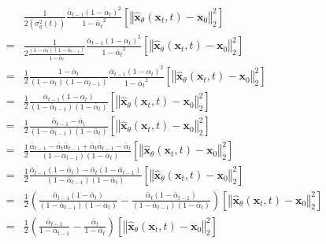 \begin{align}
    &\frac{1}{2(\sigma_{q}^{2}(t))}
    \frac{\bar{\alpha}_{t-1}{(1-\alpha_{t})}^{2}}{{ 1-\bar{\alpha}_{t}}^{2}}\left[ {\left\Vert
    \hat{\bm{x}}_{\theta}(\bm{x}_{t}, t)-\bm{x}_{0}
    \right\Vert}_{2}^{2}\right]
    \\ = & \frac{1}{2\frac{(1-\alpha_{t})(1-\bar{\alpha}_{t-1})}{1-\bar{\alpha}_{t}}}
    \frac{\bar{\alpha}_{t-1}{(1-\alpha_{t})}^{2}}{{ 1-\bar{\alpha}_{t}}^{2}}\left[ {\left\Vert
    \hat{\bm{x}}_{\theta}(\bm{x}_{t}, t)-\bm{x}_{0}
    \right\Vert}_{2}^{2}\right]
    \\ = & \frac{1}{2}\frac{1-\bar{\alpha}_{t}}{(1-\alpha_{t})(1-\bar{\alpha}_{t-1})}
    \frac{\bar{\alpha}_{t-1}{(1-\alpha_{t})}^{2}}{{ 1-\bar{\alpha}_{t}}^{2}}\left[ {\left\Vert
    \hat{\bm{x}}_{\theta}(\bm{x}_{t}, t)-\bm{x}_{0}
    \right\Vert}_{2}^{2}\right]
    \\ = & \frac{1}{2}
    \frac{\bar{\alpha}_{t-1}(1-\alpha_{t})}{(1-\bar{\alpha}_{t-1})(1-\bar{\alpha}_{t})}
    \left[ {\left\Vert
    \hat{\bm{x}}_{\theta}(\bm{x}_{t}, t)-\bm{x}_{0}
    \right\Vert}_{2}^{2}\right]
    \\ = & \frac{1}{2}
    \frac{\bar{\alpha}_{t-1}-\bar{\alpha}_{t}}{(1-\bar{\alpha}_{t-1})(1-\bar{\alpha}_{t})}
    \left[ {\left\Vert
    \hat{\bm{x}}_{\theta}(\bm{x}_{t}, t)-\bm{x}_{0}
    \right\Vert}_{2}^{2}\right]
    \\ = & \frac{1}{2}
    \frac{\bar{\alpha}_{t-1}
    -\bar{\alpha}_{t}\bar{\alpha}_{t-1}+\bar{\alpha}_{t}\bar{\alpha}_{t-1}
    -\bar{\alpha}_{t}}
    {(1-\bar{\alpha}_{t-1})(1-\bar{\alpha}_{t})}
    \left[ {\left\Vert
    \hat{\bm{x}}_{\theta}(\bm{x}_{t}, t)-\bm{x}_{0}
    \right\Vert}_{2}^{2}\right]
    \\ = & \frac{1}{2}
    \frac{\bar{\alpha}_{t-1}(1-\bar{\alpha}_{t})-\bar{\alpha}_{t}(1-\bar{\alpha}_{t-1})}
    {(1-\bar{\alpha}_{t-1})(1-\bar{\alpha}_{t})}
    \left[ {\left\Vert
    \hat{\bm{x}}_{\theta}(\bm{x}_{t}, t)-\bm{x}_{0}
    \right\Vert}_{2}^{2}\right]
    \\ = & \frac{1}{2}\left(
        \frac{\bar{\alpha}_{t-1}(1-\bar{\alpha}_{t})}{(1-\bar{\alpha}_{t-1})(1-\bar{\alpha}_{t})}
        -\frac{\bar{\alpha}_{t}(1-\bar{\alpha}_{t-1})}{(1-\bar{\alpha}_{t-1})(1-\bar{\alpha}_{t})}
    \right)
    \left[ {\left\Vert
    \hat{\bm{x}}_{\theta}(\bm{x}_{t}, t)-\bm{x}_{0}
    \right\Vert}_{2}^{2}\right]
    \\ = & \frac{1}{2}\left(
        \frac{\bar{\alpha}_{t-1}}{1-\bar{\alpha}_{t-1}}
        -\frac{\bar{\alpha}_{t}}{1-\bar{\alpha}_{t}}
    \right)
    \left[ {\left\Vert
    \hat{\bm{x}}_{\theta}(\bm{x}_{t}, t)-\bm{x}_{0}
    \right\Vert}_{2}^{2}\right] \label{eq:diffusion_learning_diffusion_noise_parameters}
\end{align}

